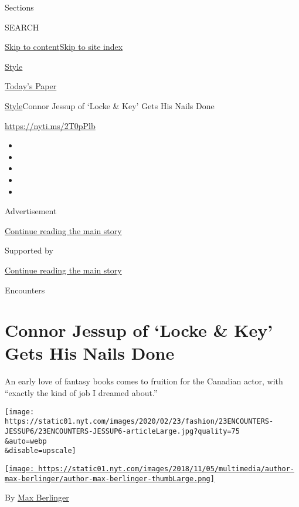 Sections

SEARCH

\protect\hyperlink{site-content}{Skip to
content}\protect\hyperlink{site-index}{Skip to site index}

\href{https://www.nytimes.com/section/style}{Style}

\href{https://myaccount.nytimes.com/auth/login?response_type=cookie\&client_id=vi}{}

\href{https://www.nytimes.com/section/todayspaper}{Today's Paper}

\href{/section/style}{Style}\textbar{}Connor Jessup of `Locke \& Key'
Gets His Nails Done

\href{https://nyti.ms/2T0pPlb}{https://nyti.ms/2T0pPlb}

\begin{itemize}
\item
\item
\item
\item
\item
\end{itemize}

Advertisement

\protect\hyperlink{after-top}{Continue reading the main story}

Supported by

\protect\hyperlink{after-sponsor}{Continue reading the main story}

Encounters

\hypertarget{connor-jessup-of-locke--key-gets-his-nails-done}{%
\section{Connor Jessup of `Locke \& Key' Gets His Nails
Done}\label{connor-jessup-of-locke--key-gets-his-nails-done}}

An early love of fantasy books comes to fruition for the Canadian actor,
with ``exactly the kind of job I dreamed about.''

\texttt{[image: https://static01.nyt.com/images/2020/02/23/fashion/23ENCOUNTERS-JESSUP6/23ENCOUNTERS-JESSUP6-articleLarge.jpg?quality=75\\\&auto=webp\\\&disable=upscale]}

\href{https://www.nytimes.com/by/max-berlinger}{\texttt{[image: https://static01.nyt.com/images/2018/11/05/multimedia/author-max-berlinger/author-max-berlinger-thumbLarge.png]}}

By \href{https://www.nytimes.com/by/max-berlinger}{Max Berlinger}

